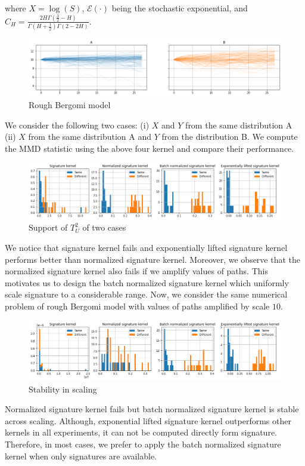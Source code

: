 \documentclass[12pt]{report}
\theoremstyle{definition}
\theoremstyle{remark}
\begin{document}
where $X = \log(S)$, $\mathcal{E}(\cdot)$ being the stochastic exponential, and $C_{H} = \frac{2 H \Gamma(\frac{3}{2} - H)}{\Gamma(H+\frac{1}{2})\Gamma(2 - 2H)}$. 
 \begin{figure}[H]
    \centering
    \includegraphics[width=\textwidth]{figs/estimation3.png}
    \caption{Rough Bergomi model}
\end{figure}
We consider the following two cases: (i) $X$ and $Y$ from the same distribution A (ii) $X$ from the same distribution A and $Y$ from the distribution B. We compute the MMD statistic using the above four kernel and compare their performance.
 \begin{figure}[H]
    \centering
    \includegraphics[width=\textwidth]{figs/estimation4.png}
    \caption{Support of $T_{U}^{2}$ of two cases}
\end{figure}
We notice that signature kernel fails and exponentially lifted signature kernel performs better than normalized signature kernel. Moreover, we observe that the normalized signature kernel also fails if we amplify values of paths. This motivates us to design the batch normalized signature kernel which uniformly scale signature to a considerable range. Now, we consider the same numerical problem of rough Bergomi model with values of paths amplified by scale $10$.
 \begin{figure}[H]
    \centering
    \includegraphics[width=\textwidth]{figs/estimation5.png}
    \caption{Stability in scaling}
\end{figure}
Normalized signature kernel fails but batch normalized signature kernel is stable across scaling. Although, exponential lifted signature kernel outperforms other kernels in all experiments, it can not be computed directly form signature. Therefore, in most cases, we prefer to apply the batch normalized signature kernel when only signatures are available. 
\end{document}
